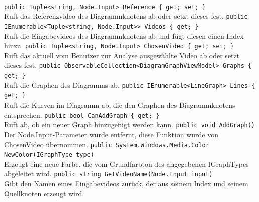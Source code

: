 \paragraph{}
\begin{itemize}
	\add \verb!public Tuple<string, Node.Input> Reference { get; set; }! \\
	Ruft das Referenzvideo des Diagrammknotens ab oder setzt dieses fest.
	\add \verb!public IEnumerable<Tuple<string, Node.Input>> Videos { get; }! \\
	Ruft die Eingabevideos des Diagrammknotens ab und fügt diesen einen Index hinzu.
	\add \verb!public Tuple<string, Node.Input> ChosenVideo { get; set; }! \\
	Ruft das aktuell vom Benutzer zur Analyse ausgewählte Video ab oder setzt dieses fest.
	\add \verb!public ObservableCollection<DiagramGraphViewModel> Graphs { get; }! \\
	Ruft die Graphen des Diagramms ab.
		\add \verb!public IEnumerable<LineGraph> Lines { get; }! \\
	Ruft die Kurven im Diagramm ab, die den Graphen des Diagrammknotens entsprechen. 
	\add \verb!public bool CanAddGraph { get; }! \\
	Ruft ab, ob ein neuer Graph hinzugefügt werden kann.
	\change \verb!public void AddGraph()! \\
	Der Node.Input-Parameter wurde entfernt, diese Funktion wurde von ChosenVideo übernommen.
	\add \verb!public System.Windows.Media.Color NewColor(IGraphType type)! \\
	Erzeugt eine neue Farbe, die vom Grundfarbton des angegebenen IGraphTypes abgeleitet wird.
	\add \verb!public string GetVideoName(Node.Input input)! \\
	Gibt den Namen eines Eingabevideos zurück, der aus seinem Index und seinem Quellknoten erzeugt wird.
\end{itemize}

